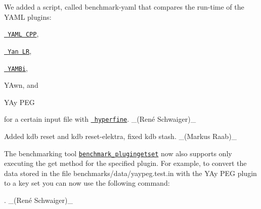 \begin{DoxyItemize}
\item We added a script, called {\ttfamily benchmark-\/yaml} that compares the run-\/time of the Y\+A\+ML plugins\+:
\begin{DoxyItemize}
\item \href{https://www.libelektra.org/plugins/yamlcpp}{\texttt{ Y\+A\+ML C\+PP}},
\item \href{https://www.libelektra.org/plugins/yanlr}{\texttt{ Yan LR}},
\item \href{https://www.libelektra.org/plugins/yambi}{\texttt{ Y\+A\+M\+Bi}},
\item Y\+Awn, and
\item Y\+Ay P\+EG
\end{DoxyItemize}

for a certain input file with \href{https://github.com/sharkdp/hyperfine}{\texttt{ hyperfine}}. \+\_\+(René Schwaiger)\+\_\+
\item Added {\ttfamily kdb reset} and {\ttfamily kdb reset-\/elektra}, fixed {\ttfamily kdb stash}. \+\_\+(\+Markus Raab)\+\_\+
\end{DoxyItemize}


\begin{DoxyItemize}
\item The benchmarking tool \href{https://master.libelektra.org/benchmarks/plugingetset.c}{\texttt{ {\ttfamily benchmark\+\_\+plugingetset}}} now also supports only executing the {\ttfamily get} method for the specified plugin. For example, to convert the data stored in the file {\ttfamily benchmarks/data/yaypeg.\+test.\+in} with the Y\+Ay P\+EG plugin to a key set you can now use the following command\+:
\end{DoxyItemize}


\begin{DoxyCode}{0}
\end{DoxyCode}


. \+\_\+(René Schwaiger)\+\_\+



